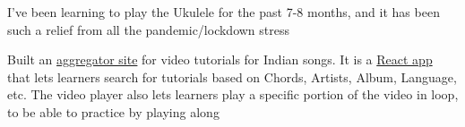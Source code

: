 \begin{cventries}
{\begin{cvitems}
        \item {I've been learning to play the Ukulele for the past 7-8 months, and it has been such a relief from all the pandemic/lockdown stress}
        \item {Built an \href{https://ukulele.muse-amuse.in/}{aggregator site} for video tutorials for Indian songs. It is a \href{https://github.com/punchagan/ukulele-tutorials/}{React app} that lets learners search for tutorials based on Chords, Artists, Album, Language, etc. The video player also lets learners play a specific portion of the video in loop, to be able to practice by playing along}
        \end{cvitems}
      }
\end{cventries}
